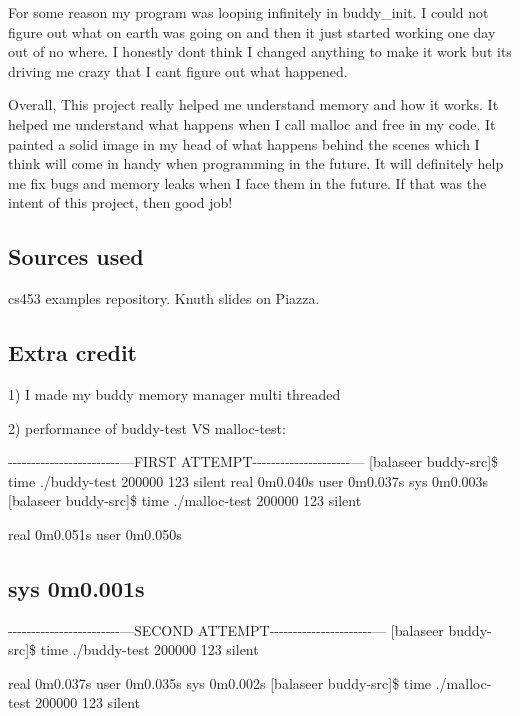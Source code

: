 For some reason my program was looping infinitely in buddy\+\_\+init. I could not figure out what on earth was going on and then it just started working one day out of no where. I honestly don\textquotesingle{}t think I changed anything to make it work but it\textquotesingle{}s driving me crazy that I can\textquotesingle{}t figure out what happened.

Overall, This project really helped me understand memory and how it works. It helped me understand what happens when I call malloc and free in my code. It painted a solid image in my head of what happens behind the scenes which I think will come in handy when programming in the future. It will definitely help me fix bugs and memory leaks when I face them in the future. If that was the intent of this project, then good job!

\subsection*{Sources used}

cs453 examples repository. Knuth slides on Piazza.

\subsection*{Extra credit}

1) I made my buddy memory manager multi threaded

2) performance of buddy-\/test V\+S malloc-\/test\+:

-\/-\/-\/-\/-\/-\/-\/-\/-\/-\/-\/-\/-\/-\/-\/-\/-\/-\/-\/-\/-\/-\/-\/-\/---F\+I\+R\+S\+T A\+T\+T\+E\+M\+P\+T-\/-\/-\/-\/-\/-\/-\/-\/-\/-\/-\/-\/-\/-\/-\/-\/-\/-\/-\/-\/-\/--- \mbox{[}balaseer buddy-\/src\mbox{]}\$ time ./buddy-\/test 200000 123 silent real 0m0.\+040s user 0m0.\+037s sys 0m0.\+003s \mbox{[}balaseer buddy-\/src\mbox{]}\$ time ./malloc-\/test 200000 123 silent

real 0m0.\+051s user 0m0.\+050s \subsection*{sys 0m0.\+001s }

-\/-\/-\/-\/-\/-\/-\/-\/-\/-\/-\/-\/-\/-\/-\/-\/-\/-\/-\/-\/-\/-\/-\/-\/---S\+E\+C\+O\+N\+D A\+T\+T\+E\+M\+P\+T-\/-\/-\/-\/-\/-\/-\/-\/-\/-\/-\/-\/-\/-\/-\/-\/-\/-\/-\/-\/-\/-\/--- \mbox{[}balaseer buddy-\/src\mbox{]}\$ time ./buddy-\/test 200000 123 silent

real 0m0.\+037s user 0m0.\+035s sys 0m0.\+002s \mbox{[}balaseer buddy-\/src\mbox{]}\$ time ./malloc-\/test 200000 123 silent

